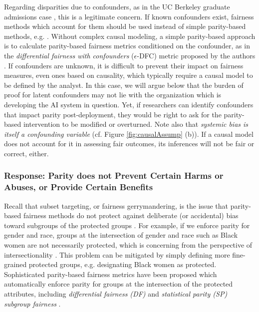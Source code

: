 \documentclass[11pt,dvipdfm]{article}
\begin{document}
Regarding disparities due to confounders, as in the UC Berkeley graduate admissions case \cite{bickel1975sex}, this is a legitimate concern.  If known confounders exist, fairness methods which account for them should be used instead of simple parity-based methods, e.g. \cite{kusner2017counterfactual,nabi2018fair,nabi2019learning}.  Without complex causal modeling, a simple parity-based approach is to calculate parity-based fairness metrics conditioned on the confounder, as in the \emph{differential fairness with confounders} ($\epsilon$-DFC) metric proposed by the authors \cite{foulds2020intersectional}.  If confounders are unknown, it is difficult to prevent their impact on fairness measures, even ones based on causality, which typically require a causal model to be defined by the analyst.  In this case, we will argue below that the burden of proof for latent confounders may not lie with the organization which is developing the AI system in question.   
Yet, if researchers can identify confounders that impact parity post-deployment, they would be right to ask for the parity-based intervention to be modified or overturned.  Note also that \emph{systemic bias is itself a confounding variable} (cf. Figure \ref{fig:causalAssump} (b)).  If a causal model does not account for it in assessing fair outcomes, its inferences will not be fair or correct, either.  

\subsubsection{Response: Parity does not Prevent Certain Harms or Abuses, or Provide Certain Benefits} 
\label{sec:responseAbuses}

Recall that subset targeting, or fairness gerrymandering, is the issue that parity-based fairness methods do not protect against deliberate (or accidental) bias toward subgroups of the protected groups \cite{dwork2012fairness, kearns2018preventing}.  For example, if we enforce parity for gender and race, groups at the intersection of gender and race such as Black women are not necessarily protected, which is concerning from the perspective of intersectionality \cite{crenshaw1989demarginalizing}.  This problem can be mitigated by simply defining more fine-grained protected groups, e.g. designating Black women as protected.  Sophisticated parity-based fairness metrics have been proposed which automatically enforce parity for groups at the intersection of the protected attributes, including \emph{differential fairness (DF)} \cite{foulds2020intersectional} and \emph{statistical parity (SP) subgroup fairness} \cite{kearns2018preventing}.
\end{document}
